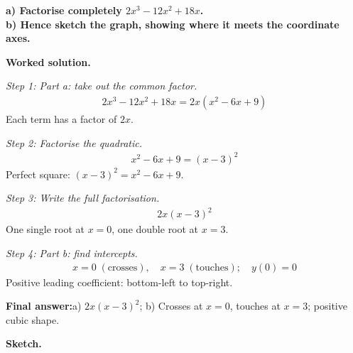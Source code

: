 \documentclass[11pt]{article}
\newcommand{\question}[1]{\par\medskip\noindent\textbf{#1}\par}
\begin{document}
\question{a) Factorise completely \( 2x^3 - 12x^2 + 18x \). \\[3pt] b) Hence sketch the graph, showing where it meets the coordinate axes.}

\textbf{Worked solution.}

\textit{Step 1: Part a: take out the common factor.}
\[\begin{gathered}
2x^3 - 12x^2 + 18x = 2x(x^2 - 6x + 9)
\end{gathered}\]
Each term has a factor of \( 2x \).

\textit{Step 2: Factorise the quadratic.}
\[\begin{gathered}
x^2 - 6x + 9 = (x - 3)^2
\end{gathered}\]
Perfect square: \( (x-3)^2 = x^2 - 6x + 9 \).

\textit{Step 3: Write the full factorisation.}
\[\begin{gathered}
2x(x - 3)^2
\end{gathered}\]
One single root at \( x = 0 \), one double root at \( x = 3 \).

\textit{Step 4: Part b: find intercepts.}
\[\begin{gathered}
x = 0 \;(\text{crosses}), \quad x = 3 \;(\text{touches}); \quad y(0) = 0
\end{gathered}\]
Positive leading coefficient: bottom-left to top-right.

\begin{answerbox}
\textbf{Final answer:}\quad a) \(\displaystyle 2x(x-3)^2\); b) Crosses at \(\displaystyle x = 0\), touches at \(\displaystyle x = 3\); positive cubic shape.
\end{answerbox}
\textbf{Sketch.}
\end{document}
